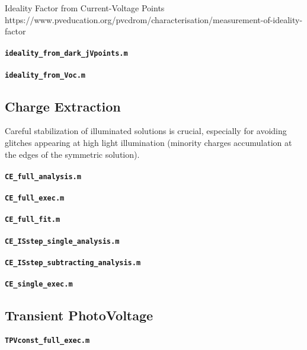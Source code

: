 Ideality Factor from Current-Voltage Points
\label{dd_ideality_dark_jv}
https://www.pveducation.org/pvcdrom/characterisation/measurement-of-ideality-factor


\paragraph{\texttt{ideality_from_dark_jVpoints.m}}
\paragraph{\texttt{ideality_from_Voc.m}}


\subsection{Charge Extraction}
Careful stabilization of illuminated solutions is crucial, especially for avoiding glitches appearing at high light illumination (minority charges accumulation at the edges of the symmetric solution).
\paragraph{\texttt{CE_full_analysis.m}}
\paragraph{\texttt{CE_full_exec.m}}
\paragraph{\texttt{CE_full_fit.m}}
\paragraph{\texttt{CE_ISstep_single_analysis.m}}
\paragraph{\texttt{CE_ISstep_subtracting_analysis.m}}
\paragraph{\texttt{CE_single_exec.m}}


\subsection{Transient PhotoVoltage}

\paragraph{\texttt{TPVconst_full_exec.m}}
